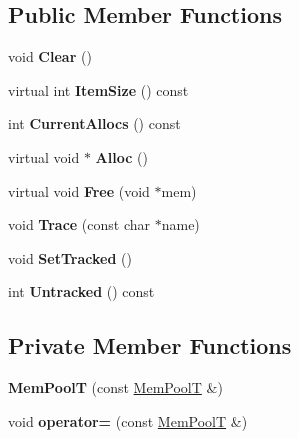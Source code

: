 \subsection*{Public Member Functions}
\begin{DoxyCompactItemize}
\item 
\mbox{\label{classtinyxml2_1_1MemPoolT_a22d595caa0e9d23aa080f49ca6475fdd}} 
void {\bfseries Clear} ()
\item 
\mbox{\label{classtinyxml2_1_1MemPoolT_a54e4d9b343459ef1731314a99877ff35}} 
virtual int {\bfseries Item\+Size} () const
\item 
\mbox{\label{classtinyxml2_1_1MemPoolT_a445a6c80151ba6268b24ec62a7c84d74}} 
int {\bfseries Current\+Allocs} () const
\item 
\mbox{\label{classtinyxml2_1_1MemPoolT_a810fd2b0caf56b8b688e55f2768f96c7}} 
virtual void $\ast$ {\bfseries Alloc} ()
\item 
\mbox{\label{classtinyxml2_1_1MemPoolT_a408ce0918e9d3d5e5e1cc4896944875f}} 
virtual void {\bfseries Free} (void $\ast$mem)
\item 
\mbox{\label{classtinyxml2_1_1MemPoolT_a47eefbd934ef70d973ea41d41ab5f239}} 
void {\bfseries Trace} (const char $\ast$name)
\item 
\mbox{\label{classtinyxml2_1_1MemPoolT_aee3c611215ae08cce41a940bf2763027}} 
void {\bfseries Set\+Tracked} ()
\item 
\mbox{\label{classtinyxml2_1_1MemPoolT_a3bcdc302ae15d2810e11192321a8f5f1}} 
int {\bfseries Untracked} () const
\end{DoxyCompactItemize}
\subsection*{Private Member Functions}
\begin{DoxyCompactItemize}
\item 
\mbox{\label{classtinyxml2_1_1MemPoolT_afa8770a0645d28bd849e7e5aefb326ed}} 
{\bfseries Mem\+PoolT} (const \mbox{\hyperlink{classtinyxml2_1_1MemPoolT}{Mem\+PoolT}} \&)
\item 
\mbox{\label{classtinyxml2_1_1MemPoolT_a12ba6478e385244beb2ca3947879fd24}} 
void {\bfseries operator=} (const \mbox{\hyperlink{classtinyxml2_1_1MemPoolT}{Mem\+PoolT}} \&)
\end{DoxyCompactItemize}
